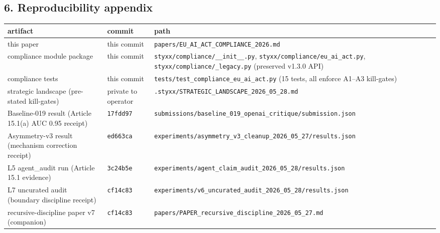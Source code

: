 \documentclass[
]{article}
\newcounter{none} %
\begin{document}
\subsection{6. Reproducibility appendix}\label{reproducibility-appendix}

{\def\LTcaptype{none} %
\begin{longtable}[]{@{}
  >{\raggedright\arraybackslash}p{}
  >{\raggedright\arraybackslash}p{}
  >{\raggedright\arraybackslash}p{}@{}}
\toprule\noalign{}
\begin{minipage}[b]{\linewidth}\raggedright
artifact
\end{minipage} & \begin{minipage}[b]{\linewidth}\raggedright
commit
\end{minipage} & \begin{minipage}[b]{\linewidth}\raggedright
path
\end{minipage} \\
\midrule\noalign{}
\endhead
\bottomrule\noalign{}
\endlastfoot
this paper & this commit &
\texttt{papers/EU\_AI\_ACT\_COMPLIANCE\_2026.md} \\
compliance module package & this commit &
\texttt{styxx/compliance/\_\_init\_\_.py},
\texttt{styxx/compliance/eu\_ai\_act.py},
\texttt{styxx/compliance/\_legacy.py} (preserved v1.3.0 API) \\
compliance tests & this commit &
\texttt{tests/test\_compliance\_eu\_ai\_act.py} (15 tests, all enforce
A1--A3 kill-gates) \\
strategic landscape (pre-stated kill-gates) & private to operator &
\texttt{.styxx/STRATEGIC\_LANDSCAPE\_2026\_05\_28.md} \\
Baseline-019 result (Article 15.1(a) AUC 0.95 receipt) &
\texttt{17fdd97} &
\texttt{submissions/baseline\_019\_openai\_critique/submission.json} \\
Asymmetry-v3 result (mechanism correction receipt) & \texttt{ed663ca} &
\texttt{experiments/asymmetry\_v3\_cleanup\_2026\_05\_27/results.json} \\
L5 agent\_audit run (Article 15.1 evidence) & \texttt{3c24b5e} &
\texttt{experiments/agent\_claim\_audit\_2026\_05\_28/results.json} \\
L7 uncurated audit (boundary discipline receipt) & \texttt{cf14c83} &
\texttt{experiments/v6\_uncurated\_audit\_2026\_05\_28/results.json} \\
recursive-discipline paper v7 (companion) & \texttt{cf14c83} &
\texttt{papers/PAPER\_recursive\_discipline\_2026\_05\_27.md} \\
\end{longtable}
}
\end{document}
